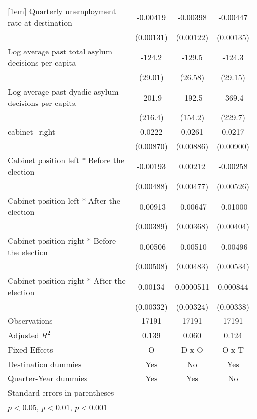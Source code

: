 \begin{table}[htbp]
\begin{tabular}{l*{3}{c}}
[1em]
Quarterly unemployment rate at destination&    -0.00419\sym{**} &    -0.00398\sym{**} &    -0.00447\sym{**} \\
                    &   (0.00131)         &   (0.00122)         &   (0.00135)         \\
[1em]
Log average past total asylum decisions per capita&      -124.2\sym{***}&      -129.5\sym{***}&      -124.3\sym{***}\\
                    &     (29.01)         &     (26.58)         &     (29.15)         \\
[1em]
Log average past dyadic asylum decisions per capita&      -201.9         &      -192.5         &      -369.4         \\
                    &     (216.4)         &     (154.2)         &     (229.7)         \\
[1em]
cabinet\_right       &      0.0222\sym{*}  &      0.0261\sym{**} &      0.0217\sym{*}  \\
                    &   (0.00870)         &   (0.00886)         &   (0.00900)         \\
[1em]
Cabinet position left * Before the election&    -0.00193         &     0.00212         &    -0.00258         \\
                    &   (0.00488)         &   (0.00477)         &   (0.00526)         \\
[1em]
Cabinet position left * After the election&    -0.00913\sym{*}  &    -0.00647         &    -0.01000\sym{*}  \\
                    &   (0.00389)         &   (0.00368)         &   (0.00404)         \\
[1em]
Cabinet position right * Before the election&    -0.00506         &    -0.00510         &    -0.00496         \\
                    &   (0.00508)         &   (0.00483)         &   (0.00534)         \\
[1em]
Cabinet position right * After the election&     0.00134         &   0.0000511         &    0.000844         \\
                    &   (0.00332)         &   (0.00324)         &   (0.00338)         \\
\hline
Observations        &       17191         &       17191         &       17191         \\
Adjusted \(R^{2}\)  &       0.139         &       0.060         &       0.124         \\
Fixed Effects       &           O         &       D x O         &       O x T         \\
Destination dummies &         Yes         &          No         &         Yes         \\
Quarter-Year dummies&         Yes         &         Yes         &          No         \\
\hline\hline
\multicolumn{4}{l}{\footnotesize Standard errors in parentheses}\\
\multicolumn{4}{l}{\footnotesize \sym{*} \(p<0.05\), \sym{**} \(p<0.01\), \sym{***} \(p<0.001\)}\\
\end{tabular}
\end{table}
